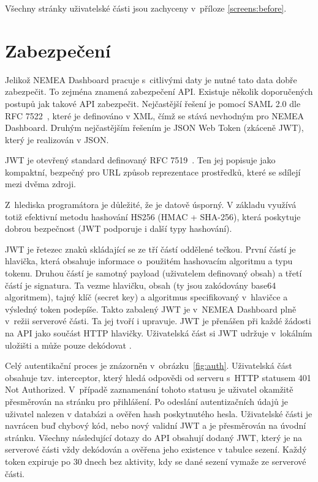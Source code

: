 Všechny stránky uživatelské části jsou zachyceny v~příloze \ref{screens:before}.

\section{Zabezpečení}
\label{zabezpeceni}

Jelikož NEMEA Dashboard pracuje s~citlivými daty je nutné tato data dobře zabezpečit. To zejména znamená zabezpečení API. Existuje několik doporučených postupů jak takové API zabezpečit. Nejčastější řešení je pomocí SAML 2.0 dle RFC 7522~\cite{rfc:saml}, které je definováno v XML, čímž se stává nevhodným pro NEMEA Dashboard. Druhým nejčastějším řešením je JSON Web Token (zkáceně JWT), který je realizován v JSON.

JWT je otevřený standard definovaný RFC 7519~\cite{rfc:jwt}. Ten jej popisuje jako kompaktní, bezpečný pro URL způsob reprezentace prostředků, které se sdílejí mezi dvěma zdroji.

Z~hlediska programátora je důležité, že je datově úsporný. V základu využívá totiž efektivní metodu hashování HS256 (HMAC + SHA-256), která poskytuje dobrou bezpečnost (JWT podporuje i další typy hashování).

JWT je řetezec znaků skládající se ze tří částí oddělené tečkou. První částí je hlavička, která obsahuje informace o~použitém hashovacím algoritmu a typu tokenu. Druhou částí je samotný payload (uživatelem definovaný obsah) a třetí částí je signatura. Ta vezme hlavičku, obsah (ty jsou zakódovány base64 algoritmem), tajný klíč (secret key) a algoritmus specifikovaný v~hlavičce a výsledný token podepíše. Takto zabalený JWT je v~NEMEA Dashboard plně v~režii serverové části. Ta jej tvoří i upravuje. JWT je přenášen při každé žádosti na API jako součást HTTP hlavičky. Uživatelská část si JWT udržuje v~lokálním uložišti a může pouze dekódovat .

Celý autentikační proces je znázorněn v~obrázku~\ref{fig:auth}. Uživatelská část obsahuje tzv. interceptor, který hledá odpovědi od serveru s~HTTP statusem 401 Not Authorized. V~případě zaznamenání tohoto statusu je uživatel okamžitě přesměrován na stránku pro přihlášení. Po odeslání autentizačních údajů je uživatel nalezen v databázi a ověřen hash poskytnutého hesla. Uživatelské části je navrácen buď chybový kód, nebo nový validní JWT a je přesměrován na úvodní stránku. Všechny následující dotazy do API obsahují dodaný JWT, který je na serverové části vždy dekódován a ověřena jeho existence v tabulce sezení. Každý token expiruje po 30 dnech bez aktivity, kdy se dané sezení vymaže ze serverové části.

